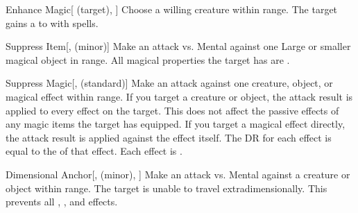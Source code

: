 \lowercase{\hypertarget{spell:Enhance Magic}{}}\label{spell:Enhance Magic}
\begin{attuneability}[\nth{1}]{\hypertarget{spell:Enhance Magic}{Enhance Magic}}[ (target), ]
Choose a willing creature within \rngmed range.
The target gains a   to  with spells.
\end{attuneability}
\vspace{0.25em}



\lowercase{\hypertarget{spell:Suppress Item}{}}\label{spell:Suppress Item}
\begin{apability}[\nth{1}]{\hypertarget{spell:Suppress Item}{Suppress Item}}[,  (minor)]
Make an attack vs. Mental against one Large or smaller magical object in \rngmed range.
\hit All magical properties the target has are .
\end{apability}
\vspace{0.25em}



\lowercase{\hypertarget{spell:Suppress Magic}{}}\label{spell:Suppress Magic}
\begin{apability}[\nth{1}]{\hypertarget{spell:Suppress Magic}{Suppress Magic}}[,  (standard)]
Make an attack against one creature, object, or magical effect within \rngmed range.
If you target a creature or object, the attack result is applied to every  effect on the target.
This does not affect the passive effects of any magic items the target has equipped.
If you target a magical effect directly, the attack result is applied against the effect itself.
The DR for each effect is equal to the  of that effect.
\hit Each effect is .
\end{apability}
\vspace{0.25em}



\lowercase{\hypertarget{spell:Dimensional Anchor}{}}\label{spell:Dimensional Anchor}
\begin{apability}[\nth{2}]{\hypertarget{spell:Dimensional Anchor}{Dimensional Anchor}}[,  (minor), ]
Make an attack vs. Mental against a creature or object within \rngmed range.
\hit The target is unable to travel extradimensionally.
This prevents all , , and  effects.
\end{apability}
\vspace{0.25em}



